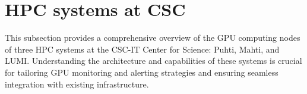 




\section{HPC systems at CSC}
This subsection provides a comprehensive overview of the GPU computing nodes of three HPC systems at the CSC-IT Center for Science: Puhti, Mahti, and LUMI. Understanding the architecture and capabilities of these systems is crucial for tailoring GPU monitoring and alerting strategies and ensuring seamless integration with existing infrastructure.

